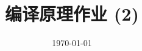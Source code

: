 \documentclass[a4paper, justified]{tufte-handout}
\title{编译原理作业 (2)}
\date{\today}
\begin{document}
\maketitle
\noplagiarism %
\begin{abstract}
\end{abstract}
\beginrequired
\end{document}
